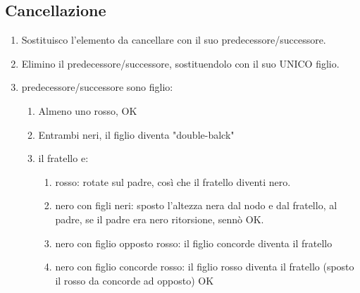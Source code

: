 \subsection{Cancellazione}

\begin{enumerate}
	\item Sostituisco l'elemento da cancellare con il suo predecessore/successore.
	
	\item Elimino il predecessore/successore, sostituendolo con il suo UNICO figlio.
	
	\item predecessore/successore sono figlio:
	
	\begin{enumerate}
		\item Almeno uno rosso, OK
		\item Entrambi neri, il figlio diventa "double-balck"
		\item il fratello e:
		\begin{enumerate}
			\item rosso: rotate sul padre, così che il fratello diventi nero. 
			\item nero con figli neri: sposto l'altezza nera dal nodo e dal fratello, al padre, se il padre era nero ritorsione, sennò OK.
			\item nero con figlio opposto rosso: il figlio concorde diventa il fratello
			\item nero con figlio concorde rosso: il figlio rosso diventa il fratello (sposto il rosso da concorde ad opposto) OK
		\end{enumerate}
	\end{enumerate}
	
\end{enumerate}















